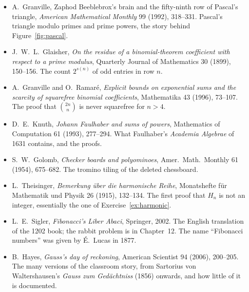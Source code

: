 \begin{itemize}
\item A.~Granville, Zaphod Beeblebrox's brain and the fifty-ninth row of Pascal's triangle, \emph{American Mathematical Monthly} 99 (1992), 318--331. Pascal's triangle modulo primes and prime powers, the story behind Figure~\ref{fig:pascal}.
\item J.~W.~L.~Glaisher, \emph{On the residue of a binomial-theorem coefficient with respect to a prime modulus}, Quarterly Journal of Mathematics 30 (1899), 150--156. The count $2^{s(n)}$ of odd entries in row $n$.
\item A.~Granville and O.~Ramar\'e, \emph{Explicit bounds on exponential sums and the scarcity of squarefree binomial coefficients}, Mathematika 43 (1996), 73--107. The proof that $\binom{2n}n$ is never squarefree for $n>4$.
\item D.~E.~Knuth, \emph{Johann Faulhaber and sums of powers}, Mathematics of Computation 61 (1993), 277--294. What Faulhaber's \emph{Academia Algebrae} of 1631 contains, and the proofs.
\item S.~W.~Golomb, \emph{Checker boards and polyominoes}, Amer.\ Math.\ Monthly 61 (1954), 675--682. The tromino tiling of the deleted chessboard.
\item L.~Theisinger, \emph{Bemerkung \"uber die harmonische Reihe}, Monatshefte f\"ur Mathematik und Physik 26 (1915), 132--134. The first proof that $H_n$ is not an integer, essentially the one of Exercise~\ref{ex:harmonic}.
\item L.~E.~Sigler, \emph{Fibonacci's Liber Abaci}, Springer, 2002. The English translation of the 1202 book; the rabbit problem is in Chapter~12. The name ``Fibonacci numbers'' was given by \'E.~Lucas in 1877.
\item B.~Hayes, \emph{Gauss's day of reckoning}, American Scientist 94 (2006), 200--205. The many versions of the classroom story, from Sartorius von Waltershausen's \emph{Gauss zum Ged\"achtniss} (1856) onwards, and how little of it is documented.
\end{itemize}
